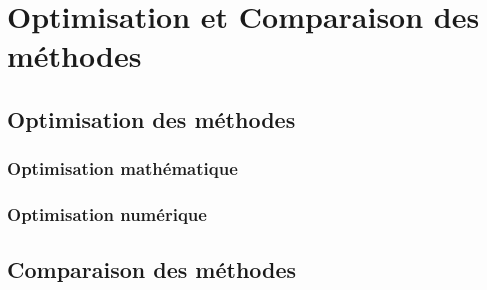 \chapter{Optimisation et Comparaison des méthodes}
\section{Optimisation des méthodes}
\subsection{Optimisation mathématique}
\subsection{Optimisation numérique}
\section{Comparaison des méthodes}